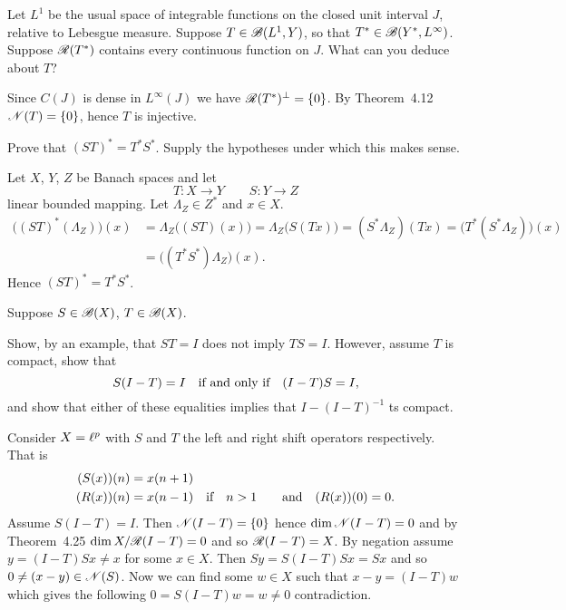 \begin{enumerate}
\begin{excopy}
Let \(L^1\) be the usual space of integrable functions on the closed unit
 interval $J$, relative
to Lebesgue measure. Suppose \(T \in \mathscr{B}(L^1, Y)\),
 so that \(T^* \in \mathscr{B}(Y^*, L^\infty)\). Suppose
\(\mathscr{R}(T^*)\) contains every continuous function on $J$.
 What can you deduce about $T$?
\end{excopy}

Since \(C(J)\) is dense in \(L^\infty(J)\) we have
\(\mathscr{R}(T^*)^\perp = \{0\}\).
By Theorem~4.12 \(\mathscr{N}(T) = \{0\}\), hence $T$ is injective.


\begin{excopy}
Prove that \((ST)^* = T^*S^*\). Supply the hypotheses under which this makes
 sense.
\end{excopy}

Let $X$, $Y$, $Z$ be Banach spaces and let 
\begin{equation*}
T: X \to Y \qquad S: Y\to Z
\end{equation*}
linear bounded mapping.
Let \(\Lambda_Z \in Z^*\) and \(x\in X\).
\begin{align*}
\bigl((ST)^*(\Lambda_Z)\bigr)(x)
 &= \Lambda_Z\bigl((ST)(x)\bigr)
  = \Lambda_Z\bigl(S(Tx)\bigr)
  = (S^*\Lambda_Z)(Tx)
  = \bigl(T^*(S^*\Lambda_Z)\bigr)(x) \\
  &= \bigl((T^*S^*)\Lambda_Z\bigr)(x).
\end{align*}
Hence \((ST)^* = T^*S^*\).


\begin{excopy}
Suppose \(S\in \mathscr{B}(X)\), \(T\in \mathscr{B}(X)\).
\begin{itemize}
Show, by an example, that \(ST = I\) does not imply \(TS = I\).
However, assume $T$ is compact, show that
\begin{equation*}
S(I - T) = I \quad \textnormal{if and only if} \quad (I - T)S = I,
\end{equation*}
and show that either of these equalities implies that 
\(I - (I - T)^{-1}\) ts compact.
\end{itemize}

\end{excopy}

\begin{itemize}
Consider \(X = \ell^p\) with $S$ and $T$ the left and right shift operators
respectively. That is 
\begin{align*}
(S(x))(n) &= x(n+1) \\
(R(x))(n) &= x(n-1) \quad \textnormal{if} \quad n>1 
\qquad \textnormal{and} \quad (R(x))(0) = 0.
\end{align*}
Assume \(S(I - T) = I\).
Then \(\mathscr{N}(I -T) = \{0\}\) 
hence \(\dim\mathscr{N}(I -T) = 0\) and
by Theorem~4.25
\(\dim X / \mathscr{R}(I - T) = 0\) and so 
\(\mathscr{R}(I - T) = X\).
By negation assume \(y = (I - T)Sx \neq x\) for some \(x\in X\).
Then \(Sy = S(I - T)Sx = Sx\) and so \(0 \neq (x-y) \in \mathscr{N}(S)\).
Now we can find some \(w\in X\) such that \(x-y = (I-T)w\)
which gives the following \(0 = S(I - T)w = w \neq 0\) contradiction.


\end{itemize}
\end{enumerate}

